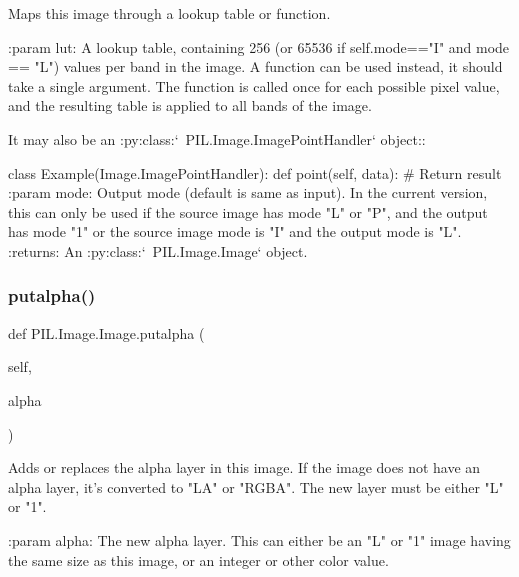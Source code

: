 \begin{DoxyVerb}Maps this image through a lookup table or function.

:param lut: A lookup table, containing 256 (or 65536 if
   self.mode=="I" and mode == "L") values per band in the
   image.  A function can be used instead, it should take a
   single argument. The function is called once for each
   possible pixel value, and the resulting table is applied to
   all bands of the image.

   It may also be an :py:class:`~PIL.Image.ImagePointHandler`
   object::

       class Example(Image.ImagePointHandler):
 def point(self, data):
   # Return result
:param mode: Output mode (default is same as input).  In the
   current version, this can only be used if the source image
   has mode "L" or "P", and the output has mode "1" or the
   source image mode is "I" and the output mode is "L".
:returns: An :py:class:`~PIL.Image.Image` object.
\end{DoxyVerb}
 \mbox{\label{classPIL_1_1Image_1_1Image_ac95871b39e72a9f747470bf55e4fcec6}} 
\subsubsection{\texorpdfstring{putalpha()}{putalpha()}}
{\footnotesize\ttfamily def P\+I\+L.\+Image.\+Image.\+putalpha (\begin{DoxyParamCaption}\item[{}]{self,  }\item[{}]{alpha }\end{DoxyParamCaption})}

\begin{DoxyVerb}Adds or replaces the alpha layer in this image.  If the image
does not have an alpha layer, it's converted to "LA" or "RGBA".
The new layer must be either "L" or "1".

:param alpha: The new alpha layer.  This can either be an "L" or "1"
   image having the same size as this image, or an integer or
   other color value.
\end{DoxyVerb}
 \mbox{\label{classPIL_1_1Image_1_1Image_a182ce6af4540d818751ffef15e9444bc}} 
